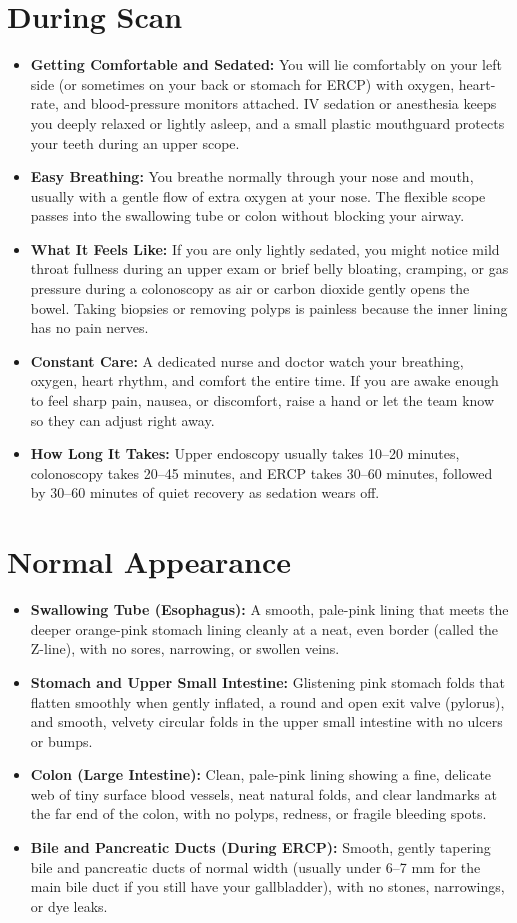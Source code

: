 \section{During Scan}
\begin{itemize}
\item \textbf{Getting Comfortable and Sedated:} You will lie comfortably on your left side (or sometimes on your back or stomach for ERCP) with oxygen, heart-rate, and blood-pressure monitors attached. IV sedation or anesthesia keeps you deeply relaxed or lightly asleep, and a small plastic mouthguard protects your teeth during an upper scope.
\item \textbf{Easy Breathing:} You breathe normally through your nose and mouth, usually with a gentle flow of extra oxygen at your nose. The flexible scope passes into the swallowing tube or colon without blocking your airway.
\item \textbf{What It Feels Like:} If you are only lightly sedated, you might notice mild throat fullness during an upper exam or brief belly bloating, cramping, or gas pressure during a colonoscopy as air or carbon dioxide gently opens the bowel. Taking biopsies or removing polyps is painless because the inner lining has no pain nerves.
\item \textbf{Constant Care:} A dedicated nurse and doctor watch your breathing, oxygen, heart rhythm, and comfort the entire time. If you are awake enough to feel sharp pain, nausea, or discomfort, raise a hand or let the team know so they can adjust right away.
\item \textbf{How Long It Takes:} Upper endoscopy usually takes 10--20 minutes, colonoscopy takes 20--45 minutes, and ERCP takes 30--60 minutes, followed by 30--60 minutes of quiet recovery as sedation wears off.
\end{itemize}

\section{Normal Appearance}
\begin{itemize}
\item \textbf{Swallowing Tube (Esophagus):} A smooth, pale-pink lining that meets the deeper orange-pink stomach lining cleanly at a neat, even border (called the Z-line), with no sores, narrowing, or swollen veins.
\item \textbf{Stomach and Upper Small Intestine:} Glistening pink stomach folds that flatten smoothly when gently inflated, a round and open exit valve (pylorus), and smooth, velvety circular folds in the upper small intestine with no ulcers or bumps.
\item \textbf{Colon (Large Intestine):} Clean, pale-pink lining showing a fine, delicate web of tiny surface blood vessels, neat natural folds, and clear landmarks at the far end of the colon, with no polyps, redness, or fragile bleeding spots.
\item \textbf{Bile and Pancreatic Ducts (During ERCP):} Smooth, gently tapering bile and pancreatic ducts of normal width (usually under 6--7 mm for the main bile duct if you still have your gallbladder), with no stones, narrowings, or dye leaks.
\end{itemize}

